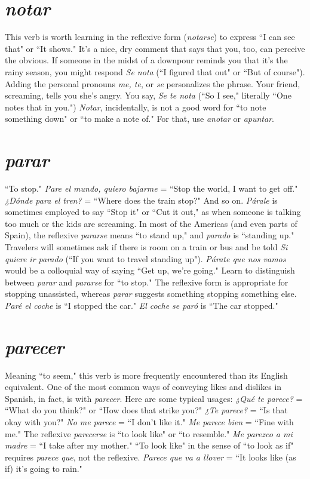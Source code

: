 \section{\emph{notar}}

This verb is worth learning in the reflexive form (\emph{notarse}) to
express ``I can see that" or ``It shows." It's a nice, dry comment that
says that you, too, can perceive the obvious. If someone in the midst of
a downpour reminds you that it's the rainy season, you might respond
\emph{Se nota} (``I figured that out" or ``But of course"). Adding the personal
pronouns \emph{me, te}, or \emph{se} personalizes the phrase. Your friend, screaming,
tells you she's angry. You say, \emph{Se te nota} (``So I see," literally ``One
notes that in you.") \emph{Notar}, incidentally, is not a good word for ``to
note something down" or ``to make a note of." For that, use \emph{anotar}
or \emph{apuntar}.

\section{\emph{parar}}

``To stop." \emph{Pare el mundo, quiero bajarme} = ``Stop the world,
I want to get off." \emph{¿Dónde para el tren?} = ``Where does the train stop?"
And so on. \emph{Párale} is sometimes employed to say ``Stop it" or ``Cut it
out," as when someone is talking too much or the kids are screaming.
In most of the Americas (and even parts of Spain), the reflexive \emph{pararse}
means ``to stand up," and \emph{parado} is ``standing up." Travelers will
sometimes ask if there is room on a train or bus and be told \emph{Si quiere
	ir parado} (``If you want to travel standing up"). \emph{Párate que nos vamos}
would be a colloquial way of saying ``Get up, we're going." Learn to
distinguish between \emph{parar} and \emph{pararse} for ``to stop." The reflexive
form is appropriate for stopping unassisted, whereas \emph{parar} suggests
something stopping something else. \emph{Paré el coche} is ``I stopped the
car." \emph{El coche se paró} is ``The car stopped."

\section{\emph{parecer}}

Meaning ``to seem," this verb is more frequently encountered
than its English equivalent. One of the most common ways of conveying likes and dislikes in Spanish, in fact, is with \emph{parecer}. Here are
some typical usages: \emph{¿Qué te parece?} = ``What do you think?" or
``How does that strike you?" \emph{¿Te parece?} = ``Is that okay with you?"
\emph{No me parece} = ``I don't like it." \emph{Me parece bien} = ``Fine with me."
The reflexive \emph{parecerse} is ``to look like" or ``to resemble." \emph{Me parezco a mi madre}
= ``I take after my mother." ``To look like" in the sense of
``to look as if" requires \emph{parece que}, not the reflexive. \emph{Parece que va a
	llover} = ``It looks like (as if) it's going to rain."

